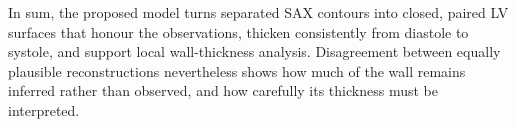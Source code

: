 In sum, the proposed model turns separated SAX contours into closed, paired LV
surfaces that honour the observations, thicken consistently from diastole to
systole, and support local wall-thickness analysis. Disagreement between
equally plausible reconstructions nevertheless shows how much of the wall
remains inferred rather than observed, and how carefully its thickness must be
interpreted.
